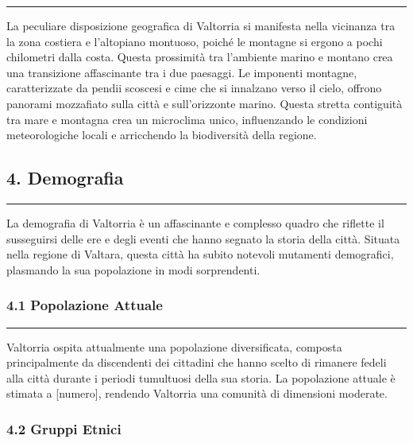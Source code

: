 \begin{center}\rule{0.5\linewidth}{0.5pt}\end{center}

La peculiare disposizione geografica di Valtorria si manifesta nella
vicinanza tra la zona costiera e l'altopiano montuoso, poiché le
montagne si ergono a pochi chilometri dalla costa. Questa prossimità tra
l'ambiente marino e montano crea una transizione affascinante tra i due
paesaggi. Le imponenti montagne, caratterizzate da pendii scoscesi e
cime che si innalzano verso il cielo, offrono panorami mozzafiato sulla
città e sull'orizzonte marino. Questa stretta contiguità tra mare e
montagna crea un microclima unico, influenzando le condizioni
meteorologiche locali e arricchendo la biodiversità della regione.

\subsection{4. Demografia}\label{demografia}

\begin{center}\rule{0.5\linewidth}{0.5pt}\end{center}

La demografia di Valtorria è un affascinante e complesso quadro che
riflette il susseguirsi delle ere e degli eventi che hanno segnato la
storia della città. Situata nella regione di Valtara, questa città ha
subito notevoli mutamenti demografici, plasmando la sua popolazione in
modi sorprendenti.

\subsubsection{\texorpdfstring{4.1 \textbf{Popolazione
Attuale}}{4.1 Popolazione Attuale}}\label{popolazione-attuale}

\begin{center}\rule{0.5\linewidth}{0.5pt}\end{center}

Valtorria ospita attualmente una popolazione diversificata, composta
principalmente da discendenti dei cittadini che hanno scelto di rimanere
fedeli alla città durante i periodi tumultuosi della sua storia. La
popolazione attuale è stimata a {[}numero{]}, rendendo Valtorria una
comunità di dimensioni moderate.

\subsubsection{\texorpdfstring{4.2 \textbf{Gruppi
Etnici}}{4.2 Gruppi Etnici}}\label{gruppi-etnici}

